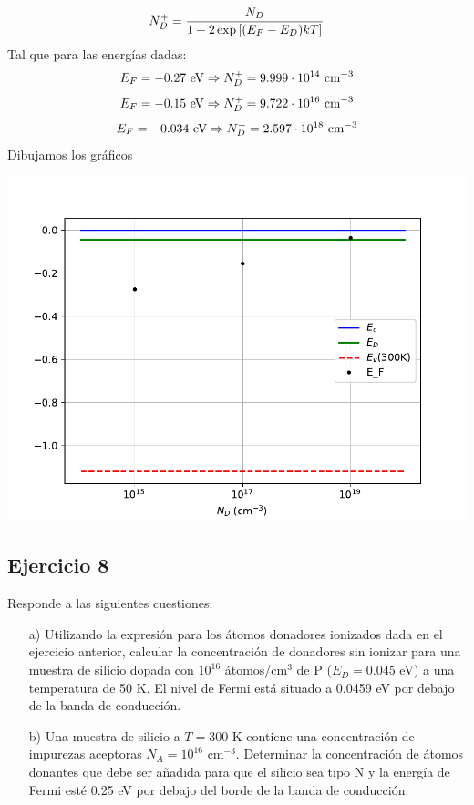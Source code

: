 \begin{equation}
	N_D^+ = \frac{N_D}{1+2\exp\left[ (E_F-E_D)kT \right]}
\end{equation}
Tal que para las energías dadas:
\begin{equation}
	E_F= -0.27  \ \text{eV} \Rightarrow N_D^+ =  9.999\cdot 10^{14}  \ \text{cm}^{-3}
\end{equation}
\begin{equation}
	E_F = -0.15 \ \text{eV}\Rightarrow N_D^+ =  9.722\cdot 10^{16} \ \text{cm}^{-3}
\end{equation}
\begin{equation}
	E_F =-0.034 \ \eV \Rightarrow N_D^+ = 2.597 \cdot 10^{18}  \ \cm^{-3}
\end{equation}
Dibujamos los gráficos
\begin{center}
	\includegraphics[width=0.9\linewidth]{Ejercicios/Ch_01/Ejercicio_01_8.pdf}
\end{center}



\begin{Enunciado}
\subsection*{Ejercicio 8}

Responde a las siguientes cuestiones:

\begin{enumerate}
	\item[a)] Utilizando la expresión para los átomos donadores ionizados dada en el ejercicio anterior, calcular la concentración de donadores sin ionizar para una muestra de silicio dopada con $10^{16}$ átomos/cm$^3$ de P ($E_D = 0.045$ eV) a una temperatura de 50 K. El nivel de Fermi está situado a 0.0459 eV por debajo de la banda de conducción.

	\item[b)] Una muestra de silicio a $T = 300$ K contiene una concentración de impurezas aceptoras $N_A = 10^{16}$ cm$^{-3}$. Determinar la concentración de átomos donantes que debe ser añadida para que el silicio sea tipo N y la energía de Fermi esté 0.25 eV por debajo del borde de la banda de conducción.
\end{enumerate}
\end{Enunciado}

\lipsum[1]



